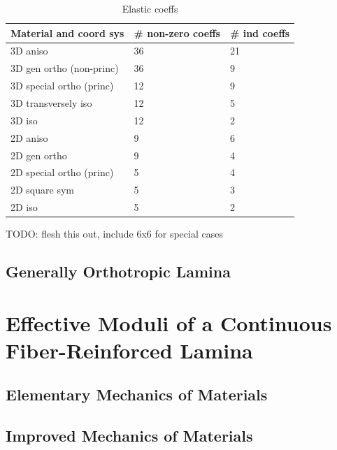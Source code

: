 \documentclass[11pt]{article}
\begin{document}
    \begin{table}[]
        \def\arraystretch{1.2}
        \centering
        \caption{Elastic coeffs}
        \label{my-label}
        \begin{tabular}{lll}
            Material and coord sys   & \# non-zero coeffs & \# ind coeffs \\ \hline
            3D aniso                 & 36                 & 21                \\
            3D gen ortho (non-princ) & 36                 & 9                 \\
            3D special ortho (princ) & 12                 & 9                 \\
            3D transversely iso      & 12                 & 5                 \\
            3D iso                   & 12                 & 2                 \\
            2D aniso                 & 9                  & 6                 \\
            2D gen ortho             & 9                  & 4                 \\
            2D special ortho (princ) & 5                  & 4                 \\
            2D square sym            & 5                  & 3                 \\
            2D iso                   & 5                  & 2                
        \end{tabular}
    \end{table}

    TODO: flesh this out, include 6x6 for special cases


    \subsection{Generally Orthotropic Lamina}



    \section{Effective Moduli of a Continuous Fiber-Reinforced Lamina}

    \subsection{Elementary Mechanics of Materials}

    \subsection{Improved Mechanics of Materials}
\end{document}
